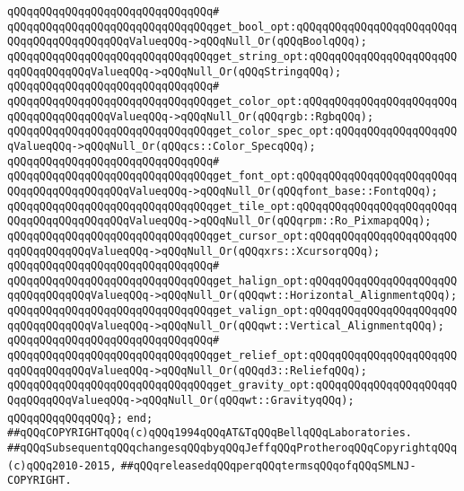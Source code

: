 \verb|qQQqqQQqqQQqqQQqqQQqqQQqqQQqqQQq#|\newline
\verb|qQQqqQQqqQQqqQQqqQQqqQQqqQQqqQQqget_bool_opt:qQQqqQQqqQQqqQQqqQQqqQQqqQQqqQQqqQQqqQQqqQQqValueqQQq->qQQqNull_Or(qQQqBoolqQQq);|\newline
\verb|qQQqqQQqqQQqqQQqqQQqqQQqqQQqqQQqget_string_opt:qQQqqQQqqQQqqQQqqQQqqQQqqQQqqQQqqQQqValueqQQq->qQQqNull_Or(qQQqStringqQQq);|\newline
\verb|qQQqqQQqqQQqqQQqqQQqqQQqqQQqqQQq#|\newline
\verb|qQQqqQQqqQQqqQQqqQQqqQQqqQQqqQQqget_color_opt:qQQqqQQqqQQqqQQqqQQqqQQqqQQqqQQqqQQqqQQqValueqQQq->qQQqNull_Or(qQQqrgb::RgbqQQq);|\newline
\verb|qQQqqQQqqQQqqQQqqQQqqQQqqQQqqQQqget_color_spec_opt:qQQqqQQqqQQqqQQqqQQqValueqQQq->qQQqNull_Or(qQQqcs::Color_SpecqQQq);|\newline
\verb|qQQqqQQqqQQqqQQqqQQqqQQqqQQqqQQq#|\newline
\verb|qQQqqQQqqQQqqQQqqQQqqQQqqQQqqQQqget_font_opt:qQQqqQQqqQQqqQQqqQQqqQQqqQQqqQQqqQQqqQQqqQQqValueqQQq->qQQqNull_Or(qQQqfont_base::FontqQQq);|\newline
\verb|qQQqqQQqqQQqqQQqqQQqqQQqqQQqqQQqget_tile_opt:qQQqqQQqqQQqqQQqqQQqqQQqqQQqqQQqqQQqqQQqqQQqValueqQQq->qQQqNull_Or(qQQqrpm::Ro_PixmapqQQq);|\newline
\verb|qQQqqQQqqQQqqQQqqQQqqQQqqQQqqQQqget_cursor_opt:qQQqqQQqqQQqqQQqqQQqqQQqqQQqqQQqqQQqValueqQQq->qQQqNull_Or(qQQqxrs::XcursorqQQq);|\newline
\verb|qQQqqQQqqQQqqQQqqQQqqQQqqQQqqQQq#|\newline
\verb|qQQqqQQqqQQqqQQqqQQqqQQqqQQqqQQqget_halign_opt:qQQqqQQqqQQqqQQqqQQqqQQqqQQqqQQqqQQqValueqQQq->qQQqNull_Or(qQQqwt::Horizontal_AlignmentqQQq);|\newline
\verb|qQQqqQQqqQQqqQQqqQQqqQQqqQQqqQQqget_valign_opt:qQQqqQQqqQQqqQQqqQQqqQQqqQQqqQQqqQQqValueqQQq->qQQqNull_Or(qQQqwt::Vertical_AlignmentqQQq);|\newline
\verb|qQQqqQQqqQQqqQQqqQQqqQQqqQQqqQQq#|\newline
\verb|qQQqqQQqqQQqqQQqqQQqqQQqqQQqqQQqget_relief_opt:qQQqqQQqqQQqqQQqqQQqqQQqqQQqqQQqqQQqValueqQQq->qQQqNull_Or(qQQqd3::ReliefqQQq);|\newline
\verb|qQQqqQQqqQQqqQQqqQQqqQQqqQQqqQQqget_gravity_opt:qQQqqQQqqQQqqQQqqQQqqQQqqQQqqQQqValueqQQq->qQQqNull_Or(qQQqwt::GravityqQQq);|\newline
\verb|qQQqqQQqqQQqqQQq};|\newline
\verb|end;|\newline
\newline
\verb|##qQQqCOPYRIGHTqQQq(c)qQQq1994qQQqAT&TqQQqBellqQQqLaboratories.|\newline
\verb|##qQQqSubsequentqQQqchangesqQQqbyqQQqJeffqQQqProtheroqQQqCopyrightqQQq(c)qQQq2010-2015,|\newline
\verb|##qQQqreleasedqQQqperqQQqtermsqQQqofqQQqSMLNJ-COPYRIGHT.|\newline

